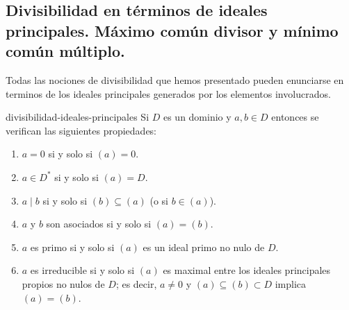 \clearpage
\subsection{Divisibilidad en términos de ideales principales. Máximo común divisor y mínimo común múltiplo.}

Todas las nociones de divisibilidad que hemos presentado pueden enunciarse en terminos de los ideales principales generados por los elementos involucrados.

\begin{proposition}{}{divisibilidad-ideales-principales}
Si \(D\) es un dominio y \(a, b \in D\) entonces se verifican las siguientes propiedades:

\begin{enumerate}
\item \(a = 0\) si y solo si \((a) = 0\).

\item \(a \in D^*\) si y solo si \((a) = D\).

\item \(a \mid b\) si y solo si \((b) \subseteq (a)\) (o si \(b \in (a)\)).

\item \(a\) y \(b\) son asociados si y solo si \((a) = (b)\).

\item \(a\) es primo si y solo si \((a)\) es un ideal primo no nulo de \(D\).

\item \(a\) es irreducible si y solo si \((a)\) es maximal entre los ideales principales propios no nulos de \(D\); es decir, \(a \neq 0\) y \((a) \subseteq (b) \subset D\) implica \((a) = (b)\).
\end{enumerate}

\end{proposition}

